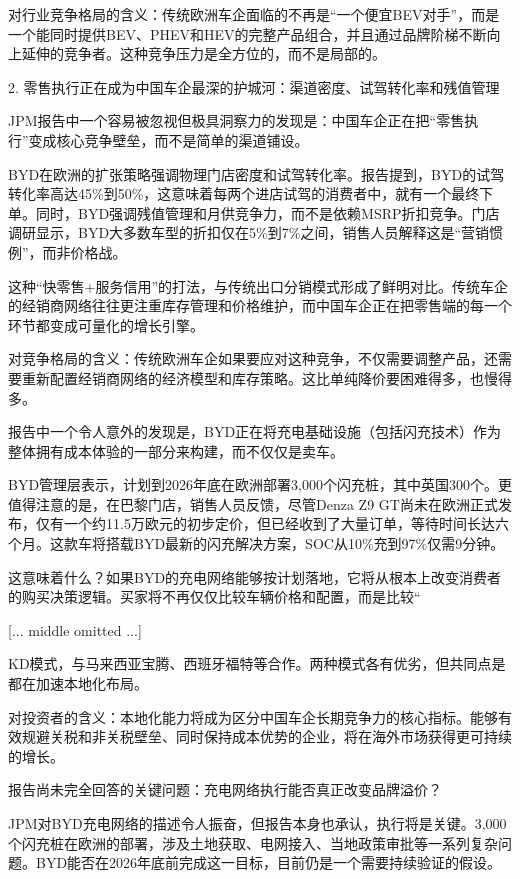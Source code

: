\documentclass[11pt]{ctexart}
\begin{document}
对行业竞争格局的含义：传统欧洲车企面临的不再是“一个便宜BEV对手”，而是一个能同时提供BEV、PHEV和HEV的完整产品组合，并且通过品牌阶梯不断向上延伸的竞争者。这种竞争压力是全方位的，而不是局部的。

2. 零售执行正在成为中国车企最深的护城河：渠道密度、试驾转化率和残值管理

JPM报告中一个容易被忽视但极具洞察力的发现是：中国车企正在把“零售执行”变成核心竞争壁垒，而不是简单的渠道铺设。

BYD在欧洲的扩张策略强调物理门店密度和试驾转化率。报告提到，BYD的试驾转化率高达45\%到50\%，这意味着每两个进店试驾的消费者中，就有一个最终下单。同时，BYD强调残值管理和月供竞争力，而不是依赖MSRP折扣竞争。门店调研显示，BYD大多数车型的折扣仅在5\%到7\%之间，销售人员解释这是“营销惯例”，而非价格战。

这种“快零售+服务信用”的打法，与传统出口分销模式形成了鲜明对比。传统车企的经销商网络往往更注重库存管理和价格维护，而中国车企正在把零售端的每一个环节都变成可量化的增长引擎。

对竞争格局的含义：传统欧洲车企如果要应对这种竞争，不仅需要调整产品，还需要重新配置经销商网络的经济模型和库存策略。这比单纯降价要困难得多，也慢得多。

报告中一个令人意外的发现是，BYD正在将充电基础设施（包括闪充技术）作为整体拥有成本体验的一部分来构建，而不仅仅是卖车。

BYD管理层表示，计划到2026年底在欧洲部署3,000个闪充桩，其中英国300个。更值得注意的是，在巴黎门店，销售人员反馈，尽管Denza Z9 GT尚未在欧洲正式发布，仅有一个约11.5万欧元的初步定价，但已经收到了大量订单，等待时间长达六个月。这款车将搭载BYD最新的闪充解决方案，SOC从10\%充到97\%仅需9分钟。

这意味着什么？如果BYD的充电网络能够按计划落地，它将从根本上改变消费者的购买决策逻辑。买家将不再仅仅比较车辆价格和配置，而是比较“

[... middle omitted ...]

KD模式，与马来西亚宝腾、西班牙福特等合作。两种模式各有优劣，但共同点是都在加速本地化布局。

对投资者的含义：本地化能力将成为区分中国车企长期竞争力的核心指标。能够有效规避关税和非关税壁垒、同时保持成本优势的企业，将在海外市场获得更可持续的增长。

报告尚未完全回答的关键问题：充电网络执行能否真正改变品牌溢价？

JPM对BYD充电网络的描述令人振奋，但报告本身也承认，执行将是关键。3,000个闪充桩在欧洲的部署，涉及土地获取、电网接入、当地政策审批等一系列复杂问题。BYD能否在2026年底前完成这一目标，目前仍是一个需要持续验证的假设。
\end{document}
